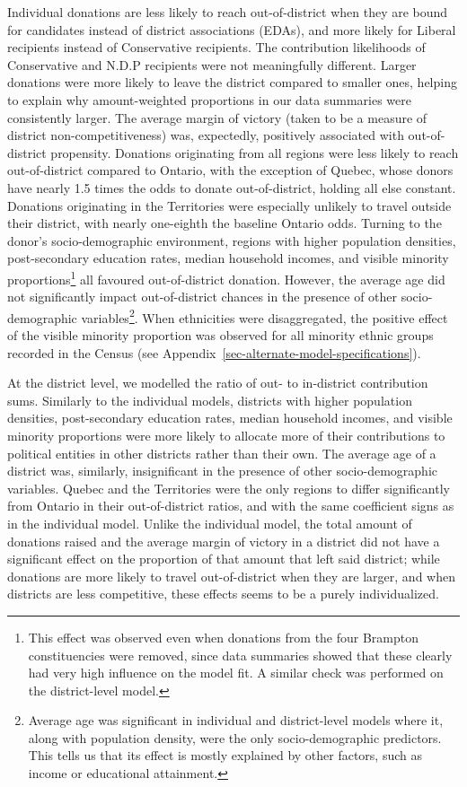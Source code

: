 \documentclass[
  letterpaper,
  DIV=11,
  numbers=noendperiod]{scrartcl}
\begin{document}
Individual donations are less likely to reach out-of-district when they
are bound for candidates instead of district associations (EDAs), and
more likely for Liberal recipients instead of Conservative recipients.
The contribution likelihoods of Conservative and N.D.P recipients were
not meaningfully different. Larger donations were more likely to leave
the district compared to smaller ones, helping to explain why
amount-weighted proportions in our data summaries were consistently
larger. The average margin of victory (taken to be a measure of district
non-competitiveness) was, expectedly, positively associated with
out-of-district propensity. Donations originating from all regions were
less likely to reach out-of-district compared to Ontario, with the
exception of Quebec, whose donors have nearly 1.5 times the odds to
donate out-of-district, holding all else constant. Donations originating
in the Territories were especially unlikely to travel outside their
district, with nearly one-eighth the baseline Ontario odds. Turning to
the donor's socio-demographic environment, regions with higher
population densities, post-secondary education rates, median household
incomes, and visible minority proportions\footnote{This effect was
  observed even when donations from the four Brampton constituencies
  were removed, since data summaries showed that these clearly had very
  high influence on the model fit. A similar check was performed on the
  district-level model.} all favoured out-of-district donation. However,
the average age did not significantly impact out-of-district chances in
the presence of other socio-demographic variables\footnote{Average age
  was significant in individual and district-level models where it,
  along with population density, were the only socio-demographic
  predictors. This tells us that its effect is mostly explained by other
  factors, such as income or educational attainment.}. When ethnicities
were disaggregated, the positive effect of the visible minority
proportion was observed for all minority ethnic groups recorded in the
Census (see Appendix~\ref{sec-alternate-model-specifications}).

At the district level, we modelled the ratio of out- to in-district
contribution sums. Similarly to the individual models, districts with
higher population densities, post-secondary education rates, median
household incomes, and visible minority proportions were more likely to
allocate more of their contributions to political entities in other
districts rather than their own. The average age of a district was,
similarly, insignificant in the presence of other socio-demographic
variables. Quebec and the Territories were the only regions to differ
significantly from Ontario in their out-of-district ratios, and with the
same coefficient signs as in the individual model. Unlike the individual
model, the total amount of donations raised and the average margin of
victory in a district did not have a significant effect on the
proportion of that amount that left said district; while donations are
more likely to travel out-of-district when they are larger, and when
districts are less competitive, these effects seems to be a purely
individualized.
\end{document}
